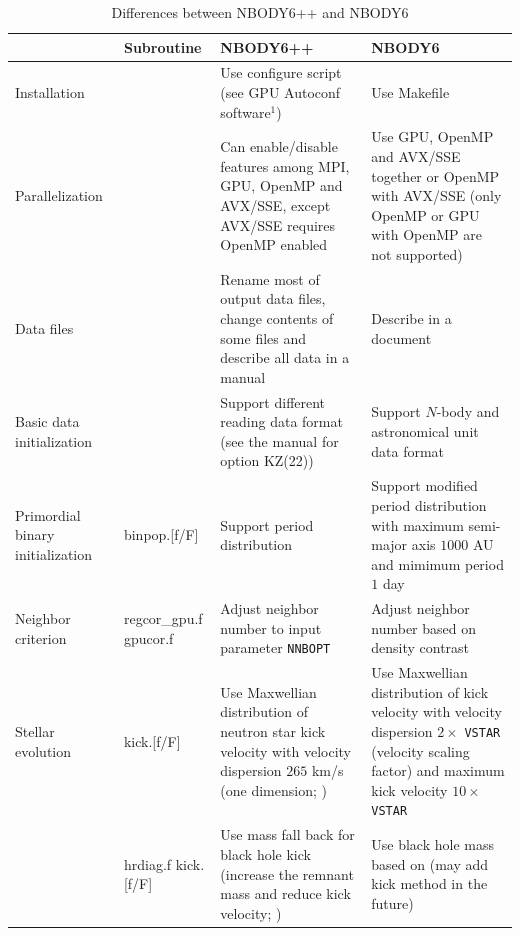 \documentclass[usenatbib,aas_macros]{mn2e}
\def\nbody{NBODY6 }
\def\nbodypp{NBODY6++ }
\def\nb{$N$-body }
\begin{document}
\begin{table}
  \label{tab:diff}
  \caption{Differences between NBODY6++ and NBODY6}
  \begin{tabular}{p{0.8in}|p{0.8in}|p{2.1in}|p{2.1in}}
    \hline
    & Subroutine &\nbodypp & \nbody\\
    \hline
    Installation  &     
                  & Use configure script (see GPU Autoconf software$^{1}$) 
                  & Use Makefile \\\hline
    Parallelization &
                    & Can enable/disable features among MPI, GPU, OpenMP and AVX/SSE,  except AVX/SSE requires OpenMP enabled
                    & Use GPU, OpenMP and AVX/SSE together or OpenMP with AVX/SSE (only OpenMP or GPU with OpenMP are not supported) \\\hline
    Data files    &     
                  & Rename most of output data files, change contents of some files and describe all data in a manual 
                  & Describe in a document \\\hline
    Basic data initialization & 
                              & Support different reading data format (see the manual for option KZ(22)) 
                              & Support \nb and astronomical unit data format \\\hline
    Primordial binary initialization & binpop.[f/F] 
                                     & Support period distribution \citep{Kroupa1995} 
                                     & Support modified period distribution with maximum semi-major axis $1000$ AU and mimimum period $1$ day \\\hline
    Neighbor criterion & regcor\_gpu.f gpucor.f 
                       & Adjust neighbor number to input parameter \texttt{NNBOPT} 
                       & Adjust neighbor number based on density contrast \\\hline
    Stellar evolution  & kick.[f/F]
                       & Use Maxwellian distribution of neutron star kick velocity with velocity dispersion $265$ km/s (one dimension; \citealp{Hobbs2005}) 
                       & Use Maxwellian distribution of kick velocity with velocity dispersion $2\times$ \texttt{VSTAR} (velocity scaling factor) and maximum kick velocity $10\times$ \texttt{VSTAR} \\
                       & hrdiag.f kick.[f/F]
                       & Use mass fall back for black hole kick (increase the remnant mass and reduce kick velocity; \citealp{Belczynski2002}) 
                       & Use black hole mass based on \cite{Eldridge2004} (may add \citealp{Belczynski2002} kick method in the future)\\

\end{tabular}
\end{table}
\end{document}
